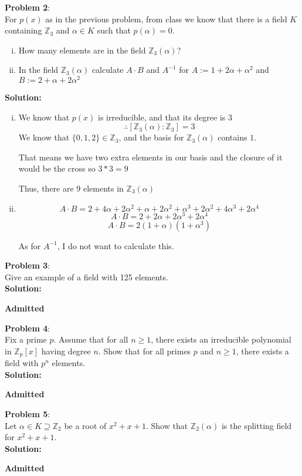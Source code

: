 \documentclass[11pt]{article}
\newcommand{\prob}[3]{\begin{flushleft}
        \textbf{Problem #1}: \\
        #2 
		\textbf{Solution:} 
		#3

\end{flushleft}}
\newcommand{\admit}{
  \begin{flushright}
    \textbf{Admitted}
  \end{flushright}
}
\begin{document}
\prob{2}{
  For $p(x)$ as in the previous problem, from class we know that there is a field $K$ containing $\mathbb{Z}_3$ and $\alpha \in K$ such that $p(\alpha) = 0$.
  \begin{enumerate}[(i)]
    \item How many elements are in the field $\mathbb{Z}_3(\alpha)$?
    \item In the field $\mathbb{Z}_3(\alpha)$ calculate $A \cdot B$ and $A^{-1}$ for
          $A := 1 + 2 \alpha + \alpha^2$ and $B := 2 + \alpha + 2 \alpha^2$
  \end{enumerate}
}{
  \begin{enumerate}[(i)]
    \item We know that $p(x)$ is irreducible, and that its degree is $3$
          $$\therefore [\mathbb{Z}_3(\alpha) : \mathbb{Z}_3] = 3$$
          We know that $\{ 0,1,2 \} \in \mathbb{Z}_3$, and the basis for
          $\mathbb{Z}_3(\alpha)$ contains $1$.

          That means we have two extra elements in our basis and the closure of it would be the cross so $3 * 3 = 9$

          Thus, there are 9 elements in $\mathbb{Z}_3(\alpha)$

    \item $$A \cdot B = 2 + 4\alpha + 2\alpha^2 + \alpha + 2\alpha^2 + \alpha^3 + 2 \alpha^2 + 4\alpha^3 + 2 \alpha^4$$
          $$A \cdot B = 2 + 2\alpha + 2\alpha^3 + 2\alpha^4$$
          $$A \cdot B = 2(1 + \alpha)(1 + \alpha^3)$$

          As for $A^{-1}$, I do not want to calculate this.
  \end{enumerate}
}

\prob{3}{
  Give an example of a field with 125 elements. \\
}{ \\
  \admit
}

\prob{4}{
Fix a prime $p$. Assume that for all $n \geq 1$, there exists an irreducible polynomial in $\mathbb{Z}_p[x]$ having degree $n$. Show that for all primes $p$ and $n \geq 1$, there exists a field with $p^n$ elements. \\
}{ \\
\admit
}

\prob{5}{
  Let $\alpha \in K \supseteq \mathbb{Z}_2$ be a root of $x^2 + x + 1$.
  Show that $\mathbb{Z}_2(\alpha)$ is the splitting field for $x^2 + x + 1$. \\
}{\\
  \admit
}
\end{document}
